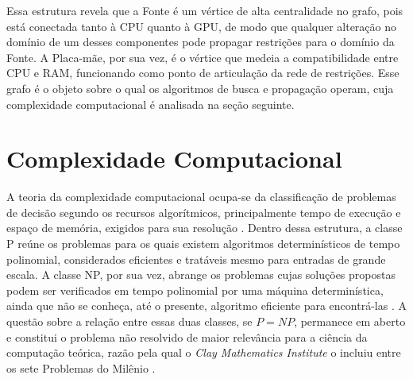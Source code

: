 
Essa estrutura revela que a Fonte é um vértice de alta centralidade no grafo, pois está conectada tanto
à CPU quanto à GPU, de modo que qualquer alteração no domínio de um desses componentes pode propagar
restrições para o domínio da Fonte. A Placa-mãe, por sua vez, é o vértice que medeia a compatibilidade entre CPU e RAM,
funcionando como ponto de articulação da rede de restrições. Esse grafo é o objeto sobre o qual os algoritmos de busca
e propagação operam, cuja complexidade computacional é analisada na seção seguinte.

\section{Complexidade Computacional}
\label{sec:complexidade}

A teoria da complexidade computacional ocupa-se da classificação de problemas de decisão segundo
os recursos algorítmicos, principalmente tempo de execução e espaço de memória, exigidos para sua resolução \cite{Cormen2001}.
Dentro dessa estrutura, a classe P reúne os problemas para os quais existem algoritmos determinísticos
de tempo polinomial, considerados eficientes e tratáveis mesmo para entradas de grande escala.
A classe NP, por sua vez, abrange os problemas cujas soluções propostas podem ser verificados em tempo polinomial
por uma máquina determinística, ainda que não se conheça, até o presente, algoritmo eficiente para encontrá-las \cite{Sipser2012}.
A questão sobre a relação entre essas duas classes, se $P = NP$, permanece em aberto e constitui
o problema não resolvido de maior relevância para a ciência da computação teórica, razão pela qual o
\textit{Clay Mathematics Institute} o incluiu entre os sete Problemas do Milênio \cite{Sipser2012}.

